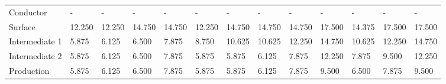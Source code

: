 \documentclass[11pt]{report}
\begin{document}
\begin{landscape}
\begin{table}
\begin{scriptsize}
\tablelasttail{\bottomrule}
\label{tab:drilling_diam}
\begin{threeparttable}
\begin{supertabular*}{1\columnwidth}{p{0.1\columnwidth}|p{0.05\columnwidth}p{0.05\columnwidth}p{0.05\columnwidth}p{0.05\columnwidth}|p{0.05\columnwidth}p{0.05\columnwidth}p{0.05\columnwidth}p{0.05\columnwidth}|p{0.05\columnwidth}p{0.05\columnwidth}p{0.05\columnwidth}p{0.05\columnwidth}}
Conductor 	& -      & -      & -      & - & -        & -      & -      & - & -       & -      & -      & - \\
Surface 		&12.250 & 12.250 & 14.750 & 14.750      & 12.250   & 14.750 & 14.750 & 14.750      & 17.500  & 14.375 & 17.500 & 17.500      \\
Intermediate 1 	&5.875  & 6.125  & 6.500  & 7.875       & 8.750    & 10.625 & 10.625 & 12.250      & 14.750  & 10.625 & 12.250 & 14.750      \\
Intermediate 2 	&5.875  & 6.125  & 6.500  & 7.875       & 5.875    & 5.875  & 6.125  & 7.875       & 12.250  & 7.875  & 9.500  & 12.250      \\
Production 	&5.875  & 6.125  & 6.500  & 7.875       & 5.875    & 5.875  & 6.125  & 7.875       & 9.500   & 6.500  & 7.875  & 9.500      \\
\end{supertabular*}
\end{threeparttable}
\end{scriptsize}
\end{table}


\end{landscape}
\end{document}
